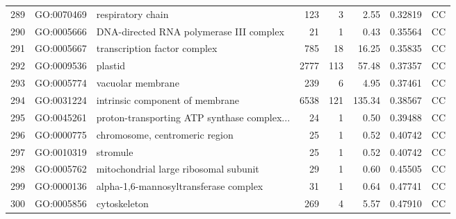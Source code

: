 \documentclass[12pt,oneside,a4paper]{article}
\begin{document}
\begin{longtable}{rllrrrll}
  289 & GO:0070469 & respiratory chain & 123 &   3 & 2.55 & 0.32819 & CC \\ 
  290 & GO:0005666 & DNA-directed RNA polymerase III complex &  21 &   1 & 0.43 & 0.35564 & CC \\ 
  291 & GO:0005667 & transcription factor complex & 785 &  18 & 16.25 & 0.35835 & CC \\ 
  292 & GO:0009536 & plastid & 2777 & 113 & 57.48 & 0.37357 & CC \\ 
  293 & GO:0005774 & vacuolar membrane & 239 &   6 & 4.95 & 0.37461 & CC \\ 
  294 & GO:0031224 & intrinsic component of membrane & 6538 & 121 & 135.34 & 0.38567 & CC \\ 
  295 & GO:0045261 & proton-transporting ATP synthase complex... &  24 &   1 & 0.50 & 0.39488 & CC \\ 
  296 & GO:0000775 & chromosome, centromeric region &  25 &   1 & 0.52 & 0.40742 & CC \\ 
  297 & GO:0010319 & stromule &  25 &   1 & 0.52 & 0.40742 & CC \\ 
  298 & GO:0005762 & mitochondrial large ribosomal subunit &  29 &   1 & 0.60 & 0.45505 & CC \\ 
  299 & GO:0000136 & alpha-1,6-mannosyltransferase complex &  31 &   1 & 0.64 & 0.47741 & CC \\ 
  300 & GO:0005856 & cytoskeleton & 269 &   4 & 5.57 & 0.47910 & CC \\ 
  \hline
\end{longtable}


\end{document}
